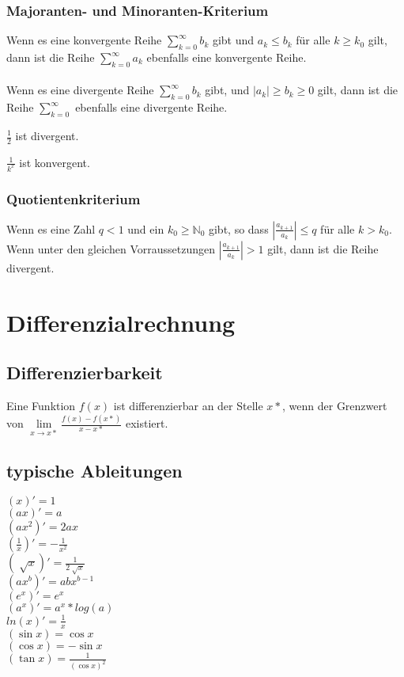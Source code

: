 \documentclass[a4paper,landscape, 11pt]{article}
\newcommand{\limFromTo}[2]{ \lim\limits_{#2 \rightarrow #1}}
\begin{document}
\begin{multicols}{5}
\begin{small}
            \subsubsection{Majoranten- und Minoranten-Kriterium}
                Wenn es eine konvergente Reihe $\sum_{k=0}^{\infty}b_k$ gibt und $a_k \le b_k$ für alle $k \ge k_0$ gilt, dann ist die Reihe $\sum_{k=0}^{\infty}a_k$ ebenfalls eine konvergente Reihe.
                \\ \\
                Wenn es eine divergente Reihe $\sum_{k=0}^{\infty}b_k$ gibt,  und $|a_k| \ge b_k \ge 0$ gilt, dann ist die Reihe $\sum_{k=0}^{\infty}$ ebenfalls eine divergente Reihe.
                
                $\frac{1}{2}$ ist divergent.
                
                $\frac{1}{k^x}$ ist konvergent.
            \subsubsection{Quotientenkriterium}
                Wenn es eine Zahl $q < 1$ und ein $k_0 \ge \mathbb{N}_0$ gibt, so dass $\left|\frac{a_{k+1}}{a_k} \right| \le q$ für alle $k > k_0.$ \\
                Wenn unter den gleichen Vorraussetzungen $\left|\frac{a_{k+1}}{a_k} \right| > 1$ gilt, dann ist die Reihe divergent.
    \section{Differenzialrechnung}
    	\subsection{Differenzierbarkeit}
                  Eine Funktion $f(x)$ ist differenzierbar an der Stelle $x*$, wenn der Grenzwert von $\limFromTo{x*}{x} \frac{f(x) - f(x*)}{x - x*}$ existiert.
    	\subsection{typische Ableitungen}
    	   \begin{multicols}{2}		
    	   		$(x)' = 1$ \\
    			$(ax)' = a$ \\
    			$(ax^2)' = 2ax$ \\
    			$(\frac{1}{x})' = -\frac{1}{x^2}$ \\
    			$(\sqrt[]{x})' = \frac{1}{2\sqrt[]{x}}$ \\
    			$(ax^b)' = abx^{b-1}$ \\
    			$(e^x)' = e^x $ \\
    			$(a^x)' = a^x*log(a) $ \\
    			$ln(x)' = \frac{1}{x}$ \\
    		 	$(\sin x) = \cos x$ \\
    		 	$(\cos x) = -\sin x$ \\
    		 	$(\tan x) = \frac{1}{(\cos x)^2}$ \\ 
    		 	\end{multicols}

\end{small}
\end{multicols}
\end{document}
